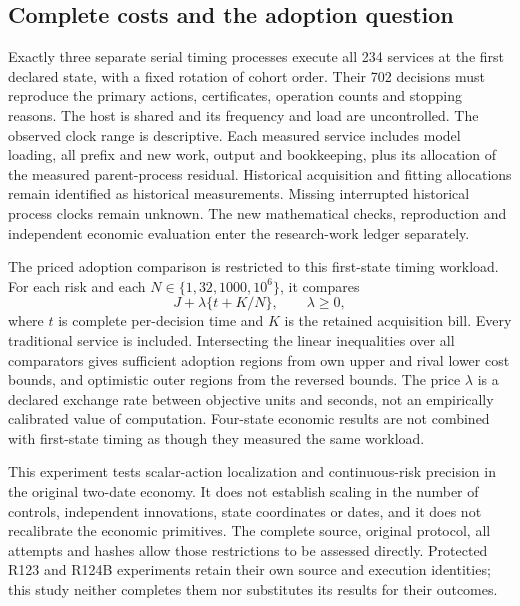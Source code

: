 \subsection{Complete costs and the adoption question}

Exactly three separate serial timing processes execute all 234 services at
the first declared state, with a fixed rotation of cohort order. Their 702
decisions must reproduce the primary actions, certificates, operation
counts and stopping reasons. The host is shared and its frequency and load
are uncontrolled. The observed clock range is descriptive. Each measured
service includes model loading, all prefix and new work, output and
bookkeeping, plus its allocation of the measured parent-process residual.
Historical acquisition and fitting allocations remain identified as
historical measurements. Missing interrupted historical process clocks
remain unknown. The new mathematical checks, reproduction and independent
economic evaluation enter the research-work ledger separately.

The priced adoption comparison is restricted to this first-state timing
workload. For each risk and each $N\in\{1,32,1000,10^6\}$, it compares
\[
        J+\lambda\{t+K/N\},\qquad \lambda\ge0,
\]
where $t$ is complete per-decision time and $K$ is the retained acquisition
bill. Every traditional service is included. Intersecting the linear
inequalities over all comparators gives sufficient adoption regions from
own upper and rival lower cost bounds, and optimistic outer regions from
the reversed bounds. The price $\lambda$ is a declared exchange rate
between objective units and seconds, not an empirically calibrated value
of computation. Four-state economic results are not combined with
first-state timing as though they measured the same workload.

This experiment tests scalar-action localization and continuous-risk
precision in the original two-date economy. It does not establish scaling
in the number of controls, independent innovations, state coordinates or
dates, and it does not recalibrate the economic primitives. The complete
source, original protocol, all attempts and hashes allow those restrictions
to be assessed directly. Protected R123 and R124B experiments retain their
own source and execution identities; this study neither completes them nor
substitutes its results for their outcomes.

